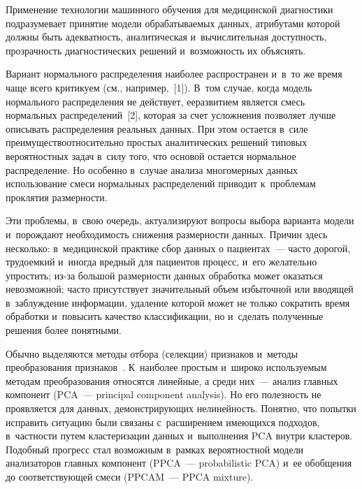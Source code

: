\thispagestyle{headings}

\begin{multicols}{2}

\label{st\stat}


     
     Применение технологии машинного обучения для медицинской 
диагностики подразумевает принятие модели обрабатываемых данных, 
атрибутами которой должны быть адекватность, аналитическая 
и~вычислительная доступность, прозрачность диагностических решений 
и~возможность их объяснять.
     
     Вариант нормального распределения наиболее распространен и~в~то же 
время чаще всего критикуем (см., например,~[1]). В~том случае, когда модель 
нормального распределения не действует, ее\linebreak развитием является смесь 
нормальных распре\-делений~[2], которая за счет усложнения позволяет лучше 
описывать распределения реальных данных. При этом остается в~силе 
преимущество\linebreak относительно простых аналитических решений типовых 
вероятностных задач в~силу того, что основой остается нормальное 
распределение. Но особенно в~случае анализа многомерных данных 
использование смеси нормальных распределений приводит к~проб\-ле\-мам 
проклятия размерности. 
     
     Эти проблемы, в~свою очередь, актуализируют вопросы выбора варианта 
модели и~порождают необходимость снижения размерности данных. Причин 
здесь несколько: в~медицинской практике сбор данных о пациентах~--- часто 
дорогой, трудоемкий и~иногда вредный для пациентов процесс, и~его 
желательно упростить; из-за большой размерности данных обработка может 
оказаться невозможной; часто присутствует значительный объем избыточной 
или вводящей в~заблуждение информации, удаление которой может не только 
сократить время обработки и~повысить качество классификации, но и~сделать 
полученные решения более понятными. 
     
     Обычно выделяются методы отбора (селекции) признаков и~методы 
преобразования признаков~\cite{3-kri}. К~наиболее простым и~широко 
используемым методам преобразования относятся линейные, а среди них~--- 
анализ главных компонент (PCA~--- principal component
analysis). Но его полезность не проявляется для 
данных, демонстрирующих нелинейность. Понятно, что попытки исправить 
ситуацию были связаны с~расширением имеющихся подходов, в~част\-ности 
путем кластеризации данных и~выполнения PCA внутри кластеров. Подобный 
прогресс стал возможным в~рамках вероятностной модели анализаторов 
главных компонент (PPCA~--- probabilistic PCA) и~ее обобщения до соответствующей смеси 
(PPCAM~--- PPCA mixture).
     

\end{multicols}
